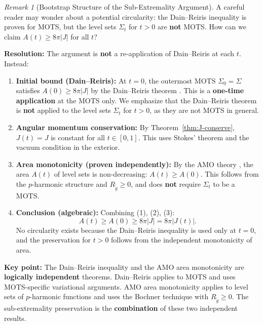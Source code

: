 \documentclass[12pt]{article}
\theoremstyle{plain}
\theoremstyle{definition}
\theoremstyle{remark}
\newtheorem{remark}[theorem]{Remark}
\newcommand{\tg}{\tilde{g}}
\begin{document}
\begin{remark}[Bootstrap Structure of the Sub-Extremality Argument]\label{rem:bootstrap-clarification}
A careful reader may wonder about a potential circularity: the Dain--Reiris inequality is proven for MOTS, but the level sets $\Sigma_t$ for $t > 0$ are \textbf{not} MOTS. How can we claim $A(t) \geq 8\pi|J|$ for all $t$?

\textbf{Resolution:} The argument is \textbf{not} a re-application of Dain--Reiris at each $t$. Instead:
\begin{enumerate}
    \item[(1)] \textbf{Initial bound (Dain--Reiris):} At $t = 0$, the outermost MOTS $\Sigma_0 = \Sigma$ satisfies $A(0) \geq 8\pi|J|$ by the Dain--Reiris theorem \cite{dain2011}. This is a \textbf{one-time application} at the MOTS only. We emphasize that the Dain--Reiris theorem is \textbf{not} applied to the level sets $\Sigma_t$ for $t > 0$, as they are not MOTS in general.
    
    \item[(2)] \textbf{Angular momentum conservation:} By Theorem~\ref{thm:J-conserve}, $J(t) = J$ is constant for all $t \in [0,1]$. This uses Stokes' theorem and the vacuum condition in the exterior.
    
    \item[(3)] \textbf{Area monotonicity (proven independently):} By the AMO theory \cite{amo2022}, the area $A(t)$ of level sets is non-decreasing: $A(t) \geq A(0)$. This follows from the $p$-harmonic structure and $R_{\tg} \geq 0$, and does \textbf{not} require $\Sigma_t$ to be a MOTS.
    
    \item[(4)] \textbf{Conclusion (algebraic):} Combining (1), (2), (3):
    \[
    A(t) \geq A(0) \geq 8\pi|J| = 8\pi|J(t)|.
    \]
    No circularity exists because the Dain--Reiris inequality is used only at $t = 0$, and the preservation for $t > 0$ follows from the independent monotonicity of area.
\end{enumerate}

\textbf{Key point:} The Dain--Reiris inequality and the AMO area monotonicity are \textbf{logically independent} theorems. Dain--Reiris applies to MOTS and uses MOTS-specific variational arguments. AMO area monotonicity applies to level sets of $p$-harmonic functions and uses the Bochner technique with $R_{\tg} \geq 0$. The sub-extremality preservation is the \textbf{combination} of these two independent results.
\end{remark}
\end{document}
